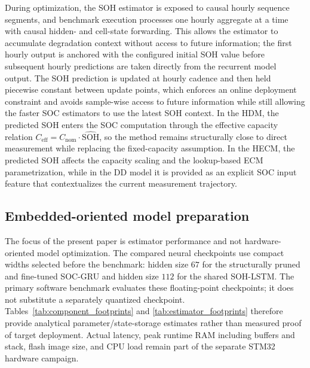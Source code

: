 \documentclass[review,nopreprintline]{elsarticle}
\begin{document}
During optimization, the SOH estimator is exposed to causal hourly sequence segments, and benchmark execution processes one hourly aggregate at a time with causal hidden- and cell-state forwarding. This allows the estimator to accumulate degradation context without access to future information; the first hourly output is anchored with the configured initial SOH value before subsequent hourly predictions are taken directly from the recurrent model output. The SOH prediction is updated at hourly cadence and then held piecewise constant between update points, which enforces an online deployment constraint and avoids sample-wise access to future information while still allowing the faster SOC estimators to use the latest SOH context. In the HDM, the predicted SOH enters the SOC computation through the effective capacity relation $C_{\mathrm{eff}} = C_{\mathrm{nom}} \cdot \widehat{\mathrm{SOH}}$, so the method remains structurally close to direct measurement while replacing the fixed-capacity assumption. In the HECM, the predicted SOH affects the capacity scaling and the lookup-based ECM parametrization, while in the DD model it is provided as an explicit SOC input feature that contextualizes the current measurement trajectory.

\subsection{Embedded-oriented model preparation}
The focus of the present paper is estimator performance and not hardware-oriented model optimization. The compared neural checkpoints use compact widths selected before the benchmark: hidden size $67$ for the structurally pruned and fine-tuned SOC-GRU and hidden size $112$ for the shared SOH-LSTM. The primary software benchmark evaluates these floating-point checkpoints; it does not substitute a separately quantized checkpoint. Tables~\ref{tab:component_footprints} and \ref{tab:estimator_footprints} therefore provide analytical parameter/state-storage estimates rather than measured proof of target deployment. Actual latency, peak runtime RAM including buffers and stack, flash image size, and CPU load remain part of the separate STM32 hardware campaign.
\end{document}
